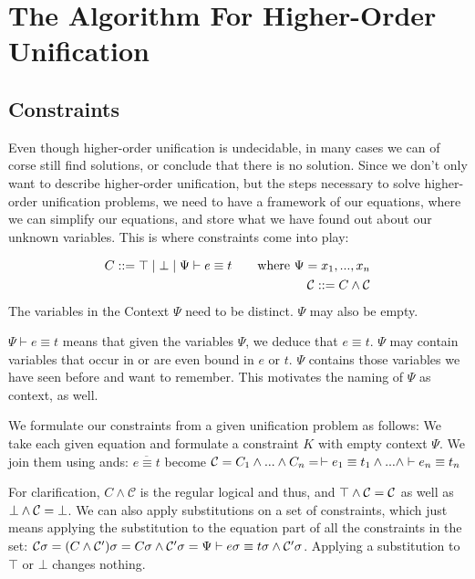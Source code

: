 \documentclass[twoside,12pt,a4paper]{article}
\begin{document}
\section{The Algorithm For Higher-Order Unification}\label{The Algorithm For Higher-Order Unification}

\subsection{Constraints}

Even though higher-order unification is undecidable, in many cases we can of corse still find solutions,
or conclude that there is no solution.
Since we don't only want to describe higher-order unification, but the steps necessary to solve higher-order unification problems,
we need to have a framework of our equations, where we can simplify our equations,
and store what we have found out about our unknown variables. This is where constraints come into play:

\begin{definition}[Constraint]
    \begin{align*}
        C ::= \top \;|\; \bot \;|\; \Psi \vdash e\equiv t \tag*{where $\Psi = x_1, ..., x_n$}\\
        \mathcal{C} ::= C \wedge \mathcal{C}
    \end{align*}
    The variables in the Context $\Psi$ need to be distinct. $\Psi$ may also be empty.
\end{definition}
$\Psi \vdash e\equiv t$ means that given the variables $\Psi$, we deduce that $e\equiv t$.
$\Psi$ may contain variables that occur in or are even bound in $e$ or $t$. 
$\Psi$ contains those variables we have seen before and want to remember. This motivates the naming of $\Psi$ as context, as well.

We formulate our constraints from a given unification problem as follows:
We take each given equation and formulate a constraint $K$ with empty context $\Psi$. We join them using ands:
$\overline{e\equiv t}$ become $\mathcal{C} = C_1 \wedge ... \wedge C_n = \, \vdash e_1 \equiv t_1 \wedge ...\wedge \vdash e_n \equiv t_n $  

For clarification, $C \wedge \mathcal{C}$ is the regular logical and thus, 
and $\top \wedge \mathcal{C} = \mathcal{C}$ as well as $\bot \wedge \mathcal{C} = \bot$.
We can also apply substitutions on a set of constraints, which just means applying the substitution to the equation part of all the constraints in the set:
$\mathcal{C} \sigma = (C \wedge \mathcal{C}')\sigma = C \sigma \wedge \mathcal{C}' \sigma  
= \Psi \vdash e\sigma\equiv t\sigma\wedge \mathcal{C}'\sigma$. Applying a substitution to $\top$ or $\bot$ changes nothing.
\end{document}
